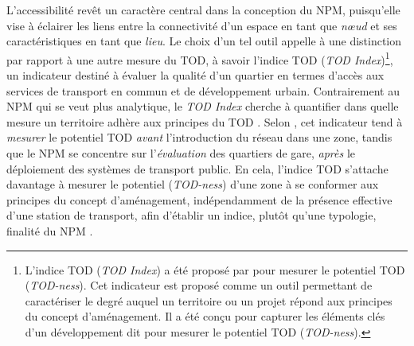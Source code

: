 \begin{refsegment}
L'accessibilité revêt un caractère central dans la conception du \acrshort{NPM}, puisqu'elle vise à éclairer les liens entre la connectivité d'un espace en tant que \textsl{nœud} et ses caractéristiques en tant que \textsl{lieu}. Le choix d'un tel outil appelle à une distinction par rapport à une autre mesure du \acrshort{TOD}, à savoir l'indice \acrshort{TOD} (\textsl{TOD Index})\footnote{
    L'indice \acrshort{TOD} (\textsl{TOD Index}) a été proposé par \textcolor{blue}{\textcite[9]{evans_transit-oriented_2007}} pour mesurer le potentiel \acrshort{TOD} (\textsl{TOD-ness}). Cet indicateur est proposé comme un outil permettant de caractériser le degré auquel un territoire ou un projet répond aux principes du concept d'aménagement. Il a été conçu pour capturer les éléments clés d'un développement dit  \textcolor{blue}{\autocite[97]{evans_transit-oriented_2007}} pour mesurer le potentiel \acrshort{TOD} (\textsl{TOD-ness}).
}, un indicateur destiné à évaluer la qualité d’un quartier en termes d'accès aux services de transport en commun et de développement urbain. Contrairement au \acrshort{NPM} qui se veut plus analytique, le \textsl{TOD Index} cherche à quantifier dans quelle mesure un territoire adhère aux principes du \acrshort{TOD} \textcolor{blue}{\autocite[3]{pezeshknejad_evaluating_2020}}. Selon \textcolor{blue}{\textcite[96]{singh_measuring_2017}}, cet indicateur tend à \textsl{mesurer} le potentiel \acrshort{TOD} \textsl{avant} l'introduction du réseau dans une zone, tandis que le \acrshort{NPM} se concentre sur l'\textsl{évaluation} des quartiers de gare, \textsl{après} le déploiement des systèmes de transport public. En cela, l'indice \acrshort{TOD} s'attache davantage à mesurer le potentiel (\textsl{TOD-ness}) d'une zone à se conformer aux principes du concept d'aménagement, indépendamment de la présence effective d’une station de transport, afin d’établir un indice, plutôt qu’une typologie, finalité du \acrshort{NPM} \textcolor{blue}{\autocite[97, 107]{evans_transit-oriented_2007}}.%


\end{refsegment}
